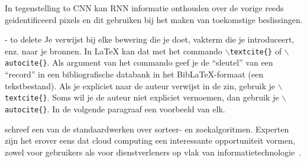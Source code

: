 In tegenstelling to CNN kan RNN informatie onthouden over de vorige reeds geidentificeerd pixels en dit gebruiken bij het maken van toekomstige beslissingen.

- to delete
Je verwijst bij elke bewering die je doet, vakterm die je introduceert, enz. naar je bronnen. In \LaTeX{} kan dat met het commando \texttt{$\backslash${textcite\{\}}} of \texttt{$\backslash${autocite\{\}}}. Als argument van het commando geef je de ``sleutel'' van een ``record'' in een bibliografische databank in het Bib\LaTeX{}-formaat (een tekstbestand). Als je expliciet naar de auteur verwijst in de zin, gebruik je \texttt{$\backslash${}textcite\{\}}.
Soms wil je de auteur niet expliciet vernoemen, dan gebruik je \texttt{$\backslash${}autocite\{\}}. In de volgende paragraaf een voorbeeld van elk.

\textcite{Knuth1998} schreef een van de standaardwerken over sorteer- en zoekalgoritmen. Experten zijn het erover eens dat cloud computing een interessante opportuniteit vormen, zowel voor gebruikers als voor dienstverleners op vlak van informatietechnologie~\autocite{Creeger2009}.
